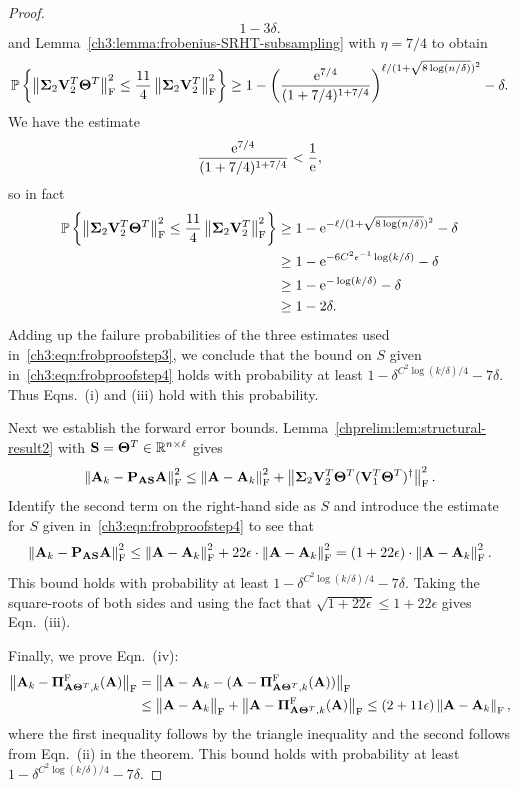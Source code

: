 \begin{proof}
\[        1 - 3\delta.
\]
and Lemma~\ref{ch3:lemma:frobenius-SRHT-subsampling} with $\eta=7/4$ to obtain
\[
 \Prob{\FNormS{\matSig_2 \matV_2 \transp \matTh\transp} \le  
  \frac{11}{4} \FNormS{\matSig_2 \matV_2\transp  }} \geq 
  1 - \left( \frac{\expe^{7/4}}{ (1 + 7/4)^{1 + 7/4} } \right)^%
  {\ell/(1 + \sqrt{8 \log(n/\delta)})^2} - \delta.
 \]
We have the estimate
\[
\frac{\mathrm{e}^{7/4}}{ (1 + 7/4)^{1 + 7/4} } < \frac{1}{\mathrm{e}},
\]
so in fact
\begin{align*}
\mathbb{P}\left\{\left\|\mathbf{\Sigma}_2 \mathbf{V}_2 ^T \mathbf{\Theta}^T\right\|_\mathrm{F}^2 \le  
 \frac{11}{4} \left\|\mathbf{\Sigma}_2 \mathbf{V}_2 ^T  \right\|_\mathrm{F}^2\right\} & \geq 
 1 - \mathrm{e}^{-\ell/(1 + \sqrt{8 \log(n/\delta)})^2} - \delta \\
 & \ge 1 - \mathrm{e}^{-6 C^2 \epsilon^{-1} \log(k/\delta)} - \delta \\\
 & \ge 1 - \mathrm{e}^{ -\log(k/\delta)} - \delta \\
  & \ge 1 - 2\delta.
\end{align*}
Adding up the failure probabilities of the three estimates used in~\eqref{ch3:eqn:frobproofstep3},
we conclude that the bound on $S$ given in~\eqref{ch3:eqn:frobproofstep4}
holds with probability at least $1 - \delta^{C^2 \log(k/\delta)/4} - 7\delta.$
Thus Eqns.~(i) and (iii) hold with this probability.

Next we establish the forward error bounds.
Lemma~\ref{chprelim:lem:structural-result2} with
$\mathbf{S} = \mathbf{\Theta}^T \in \mathbb{R}^{n \times \ell}$  gives
\[
\left\|\mathbf{A}_k - \mathbf{P}_{\mathbf{A} \mathbf{S}} \mathbf{A}\right\|_\mathrm{F}^2 \leq \left\|\mathbf{A} - \mathbf{A}_k\right\|_\mathrm{F}^2 +
\left\|\mathbf{\Sigma}_2 \mathbf{V}_2 ^T \mathbf{\Theta}^T 
 ( \mathbf{V}_1 ^T \mathbf{\Theta}^T)^\dagger \right\|_\mathrm{F}^2.
\]
Identify the second term on the right-hand side as $S$ and introduce the
estimate for $S$ given in~\eqref{ch3:eqn:frobproofstep4} to see that
\[
\left\|\mathbf{A}_k - \mathbf{P}_{\mathbf{A}\mathbf{S}} \mathbf{A}\right\|_\mathrm{F}^2 \leq \left\|\mathbf{A} - \mathbf{A}_k\right\|_\mathrm{F}^2 +
22 \epsilon \cdot \left\|\mathbf{A} - \mathbf{A}_k\right\|_\mathrm{F}^2  = 
\left( 1 + 22 \epsilon \right) \cdot \left\|\mathbf{A} - \mathbf{A}_k\right\|_\mathrm{F}^2.
\]
This bound holds with probability at least $1 - \delta^{C^2 \log(k/\delta)/4} - 7\delta.$
Taking the square-roots of both sides and using the fact that 
$\sqrt{1 +  22 \epsilon} \le 1 +  22 \epsilon$ gives Eqn.~(iii).

Finally, we prove Eqn.~(iv):
\begin{align*}
\big\|\mathbf{A}_k -  \boldsymbol{\Pi}_{\mathbf{A}\mathbf{\Theta}^T, k}^{\mathrm{F}}(\mathbf{A})\big\|_{\mathrm{F}} & = 
\big\|\mathbf{A}-\mathbf{A}_k - (\mathbf{A}-\boldsymbol{\Pi}_{\mathbf{A}\mathbf{\Theta}^T, k}^{\mathrm{F}}(\mathbf{A}))\big\|_{\mathrm{F}} \\
& \leq 
\big\|\mathbf{A} - \mathbf{A}_k\big\|_{\mathrm{F}} + \big\|\mathbf{A} -  \boldsymbol{\Pi}_{\mathbf{A}\mathbf{\Theta}^T, k}^{\mathrm{F}}(\mathbf{A})\big\|_{\mathrm{F}} 
\le (2+11\epsilon) \left\|\mathbf{A}-\mathbf{A}_k\right\|_\mathrm{F},
\end{align*}
%
where the first inequality follows by the triangle inequality and the second 
follows from Eqn.~(ii) in the theorem. This bound holds with probability at least $1 - \delta^{C^2 \log(k/\delta)/4} - 7\delta.$

\end{proof}


